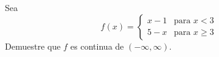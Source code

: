 \setcounter{enumi}{34}
\item Sea
$$f(x) = \begin{cases} x - 1 & \text{para } x < 3 \\ 5 - x & \text{para } x \ge 3 \end{cases}$$
Demuestre que $f$ es continua de $(-\infty, \infty)$.
